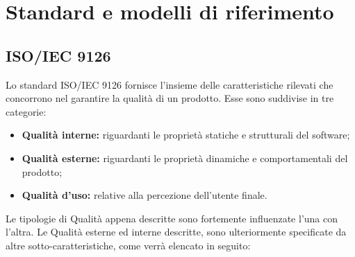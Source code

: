\appendix \section{Standard e modelli di riferimento}
\subsection{ISO/IEC 9126}
Lo standard ISO/IEC 9126 fornisce l'insieme delle caratteristiche rilevati che concorrono nel garantire la qualità di un prodotto. Esse sono suddivise in tre categorie:
\begin{itemize}
	\item \textbf{Qualità interne:} riguardanti le proprietà statiche e strutturali del software;
	\item \textbf{Qualità esterne:} riguardanti le proprietà dinamiche e comportamentali del prodotto;
	\item \textbf{Qualità d'uso:} relative alla percezione dell'utente finale.
\end{itemize}
Le tipologie di Qualità appena descritte sono fortemente influenzate l'una con l'altra. Le Qualità esterne ed interne descritte, sono ulteriormente specificate da altre sotto-caratteristiche, come verrà elencato in seguito:
